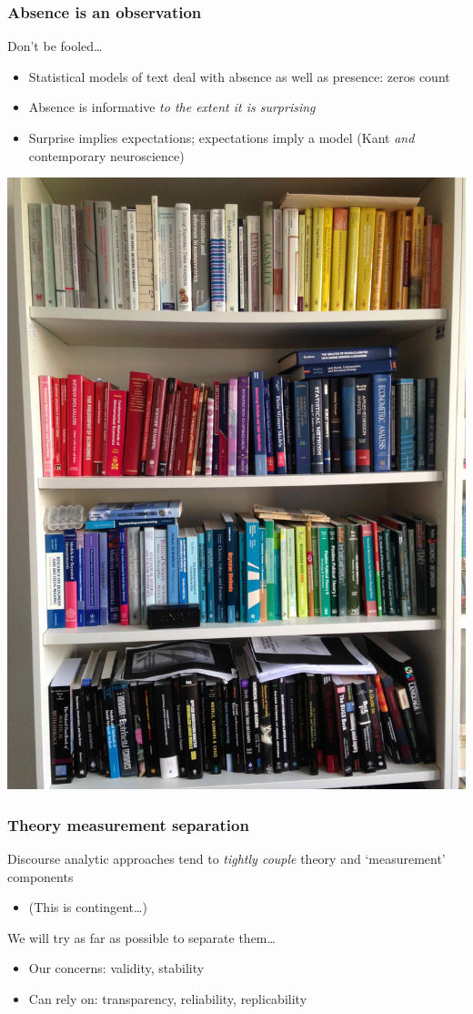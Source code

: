 \documentclass[11pt,compress,professionalfonts]{beamer}
\newcommand{\ita}{\begin{itemize}}
\newcommand{\itm}{\item[]}
\newcommand{\itz}{\end{itemize}}
\begin{document}
\begin{frame}[t]\frametitle{Absence is an observation}

Don't be fooled\ldots
\ita
\itm Statistical models of text deal with absence as well as presence: zeros count
\itm Absence is informative \textit{to the extent it is surprising}
\itm Surprise implies expectations; expectations imply a model (Kant \textit{and} contemporary neuroscience)
\itz

\newpage

\centerline{\includegraphics[scale=.12]{pictures/distant-reading}}

\end{frame}
\begin{frame}[t]\frametitle{Theory measurement separation}

Discourse analytic approaches tend to \textit{tightly couple} theory and `measurement' components
\ita
\itm (This is contingent\ldots)
\itz
We will try as far as possible to separate them\ldots
\ita
\itm Our concerns: validity, stability
\itm Can rely on: transparency, reliability, replicability
\itz



\end{frame}
\end{document}
